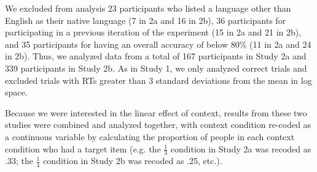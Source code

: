 \documentclass[10pt,letterpaper]{article}
\begin{document}
We excluded from analysis 23 participants who listed a language other than English as their native language (7 in 2a and 16 in 2b), 36 participants for participating in a previous iteration of the experiment (15 in 2a and 21 in 2b), and 35 participants for having an overall accuracy of below 80\% (11 in 2a and 24 in 2b).  Thus, we analyzed data from a total of 167 participants in Study 2a and 339 participants in Study 2b. As in Study 1, we only analyzed correct trials and excluded trials with RTs greater than 3 standard deviations from the mean in log space.  

Because we were interested in the linear effect of context, results from these two studies were combined and analyzed together, with context condition re-coded as a continuous variable by calculating the proportion of people in each context condition who had a target item (e.g. the $\frac{1}{3}$ condition in Study 2a was recoded as .33; the $\frac{1}{4}$ condition in Study 2b was recoded as .25, etc.). 
\end{document}

